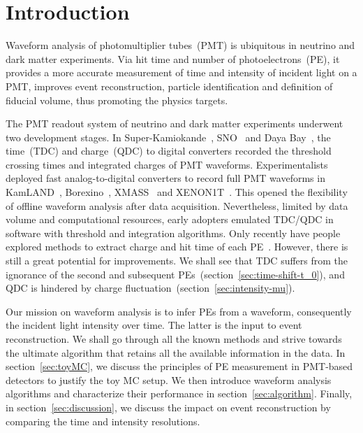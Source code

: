 \section{Introduction}
\label{sec:introduction}

Waveform analysis of photomultiplier tubes~(PMT) is ubiquitous in neutrino and dark matter experiments.  Via hit time and number of photoelectrons~(PE), it provides a more accurate measurement of time and intensity of incident light on a PMT, improves event reconstruction, particle identification and definition of fiducial volume, thus promoting the physics targets.

The PMT readout system of neutrino and dark matter experiments underwent two development stages. In Super-Kamiokande~\cite{noauthor_super-kamiokande_2003}, SNO~\cite{dunger_event_2019} and Daya Bay~\cite{daya_bay_collaboration_measurement_2017}, the time~(TDC) and charge~(QDC) to digital converters recorded the threshold crossing times and integrated charges of PMT waveforms.  Experimentalists deployed fast analog-to-digital converters to record full PMT waveforms in KamLAND~\cite{kamland_collaboration_production_2010}, Borexino~\cite{alimonti_borexino_2009}, XMASS~\cite{abe_xmass_2013} and XENON1T~\cite{xenon_collaboration_xenon1t_2019}.  This opened the flexibility of offline waveform analysis after data acquisition.  Nevertheless, limited by data volume and computational resources, early adopters emulated TDC/QDC in software with threshold and integration algorithms.  Only recently have people explored methods to extract charge and hit time of each PE~\cite{zhang_comparison_2019}.  However, there is still a great potential for improvements.  We shall see that TDC suffers from the ignorance of the second and subsequent PEs~(section~\ref{sec:time-shift-t_0}), and QDC is hindered by charge fluctuation~(section~\ref{sec:intensity-mu}).

Our mission on waveform analysis is to infer PEs from a waveform, consequently the incident light intensity over time.  The latter is the input to event reconstruction.  We shall go through all the known methods and strive towards the ultimate algorithm that retains all the available information in the data.  In section~\ref{sec:toyMC}, we discuss the principles of PE measurement in PMT-based detectors to justify the toy MC setup.  We then introduce waveform analysis algorithms and characterize their performance in section~\ref{sec:algorithm}.  Finally, in section~\ref{sec:discussion}, we discuss the impact on event reconstruction by comparing the time and intensity resolutions.
